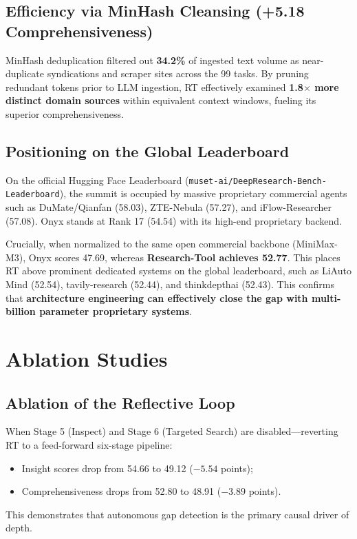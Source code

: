 \documentclass[11pt,a4paper]{article}
\begin{document}
\subsection{Efficiency via MinHash Cleansing (+5.18 Comprehensiveness)}

MinHash deduplication filtered out \textbf{34.2\%} of ingested text volume as near-duplicate syndications and scraper sites across the 99 tasks. By pruning redundant tokens prior to LLM ingestion, RT effectively examined \textbf{1.8$\times$ more distinct domain sources} within equivalent context windows, fueling its superior comprehensiveness.

\subsection{Positioning on the Global Leaderboard}

On the official Hugging Face Leaderboard (\texttt{muset-ai/DeepResearch-Bench-Leaderboard}), the summit is occupied by massive proprietary commercial agents such as DuMate/Qianfan (58.03), ZTE-Nebula (57.27), and iFlow-Researcher (57.08). Onyx stands at Rank 17 (54.54) with its high-end proprietary backend.

Crucially, when normalized to the same open commercial backbone (MiniMax-M3), Onyx scores 47.69, whereas \textbf{Research-Tool achieves 52.77}. This places RT above prominent dedicated systems on the global leaderboard, such as LiAuto Mind (52.54), tavily-research (52.44), and thinkdepthai (52.43). This confirms that \textbf{architecture engineering can effectively close the gap with multi-billion parameter proprietary systems}.

\section{Ablation Studies}

\subsection{Ablation of the Reflective Loop}
When Stage 5 (Inspect) and Stage 6 (Targeted Search) are disabled—reverting RT to a feed-forward six-stage pipeline:
\begin{itemize}
    \item Insight scores drop from 54.66 to 49.12 ($-5.54$ points);
    \item Comprehensiveness drops from 52.80 to 48.91 ($-3.89$ points).
\end{itemize}
This demonstrates that autonomous gap detection is the primary causal driver of depth.
\end{document}
